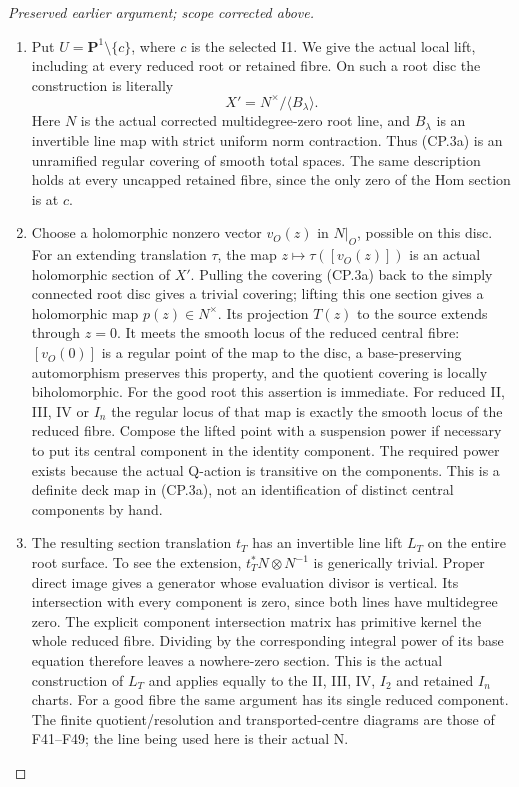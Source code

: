 \begin{proof}[Preserved earlier argument; scope corrected above]
\begin{enumerate}[label=\arabic*.]
\item Put \(U=\mathbf P^1\setminus\{c\}\), where \(c\) is the selected
I1. We give the actual local lift, including at every reduced root or
retained fibre. On such a root disc the construction is literally
\[
              X'=N^\times/\langle B_\lambda\rangle .
                                                               \tag{CP.3a}
\]
Here \(N\) is the actual corrected multidegree-zero root line, and
\(B_\lambda\) is an invertible line map with strict uniform norm
contraction. Thus (CP.3a) is an unramified regular covering of smooth
total spaces. The same description holds at every uncapped retained
fibre, since the only zero of the Hom section is at \(c\).

\item Choose a holomorphic nonzero vector \(v_O(z)\) in \(N|_O\), possible
on this disc. For an extending translation \(\tau\), the map
\(z\mapsto\tau([v_O(z)])\) is an actual holomorphic section of
\(X'\). Pulling the covering (CP.3a) back to the simply connected
root disc gives a trivial covering; lifting this one section gives
a holomorphic map \(p(z)\in N^\times\). Its projection \(T(z)\)
to the source extends through \(z=0\). It meets the smooth locus
of the reduced central fibre: \([v_O(0)]\) is a regular point of
the map to the disc, a base-preserving automorphism preserves this
property, and the quotient covering is locally biholomorphic. For
the good root this assertion is immediate. For reduced II, III,
IV or \(I_n\) the regular locus of that map is exactly the smooth locus
of the reduced fibre. Compose the lifted point with a suspension
power if necessary to put its central component in the identity
component. The required power exists because the actual Q-action
is transitive on the components. This is a definite deck map in
(CP.3a), not an identification of distinct central components by hand.

\item The resulting section translation \(t_T\) has an invertible line
lift \(L_T\) on the entire root surface. To see the extension,
\(t_T^*N\otimes N^{-1}\) is generically trivial. Proper direct
image gives a generator whose evaluation divisor is vertical. Its
intersection with every component is zero, since both lines have
multidegree zero. The explicit component intersection matrix has
primitive kernel the whole reduced fibre. Dividing by the
corresponding integral power of its base equation therefore leaves
a nowhere-zero section. This is the actual construction of \(L_T\)
and applies equally to the II, III, IV, \(I_2\) and retained \(I_n\) charts.
For a good fibre the same argument has its single reduced component.
The finite quotient/resolution and transported-centre diagrams are
those of F41--F49; the line being used here is their actual N.


\end{enumerate}
\end{proof}
